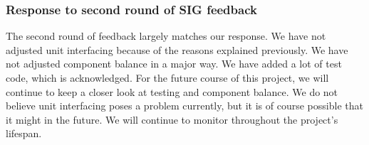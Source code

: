 \subsubsection{Response to second round of SIG feedback}
The second round of feedback largely matches our response.
We have not adjusted unit interfacing because of the reasons explained previously.
We have not adjusted component balance in a major way.
We have added a lot of test code, which is acknowledged.
For the future course of this project, we will continue to keep a closer look at testing and component balance.
We do not believe unit interfacing poses a problem currently, but it is of course possible that it might in the future.
We will continue to monitor throughout the project's lifespan.